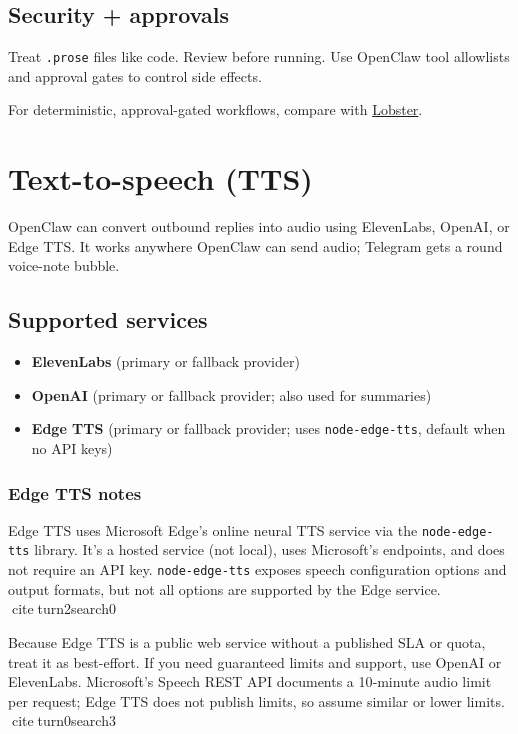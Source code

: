 \subsection{Security + approvals}


Treat \texttt{.prose} files like code. Review before running. Use OpenClaw tool allowlists and approval gates to control side effects.

For deterministic, approval-gated workflows, compare with \href{/tools/lobster}{Lobster}.


\clearpage

\section{Text-to-speech (TTS)}


OpenClaw can convert outbound replies into audio using ElevenLabs, OpenAI, or Edge TTS.
It works anywhere OpenClaw can send audio; Telegram gets a round voice-note bubble.

\subsection{Supported services}


\begin{itemize}
  \item \textbf{ElevenLabs} (primary or fallback provider)
  \item \textbf{OpenAI} (primary or fallback provider; also used for summaries)
  \item \textbf{Edge TTS} (primary or fallback provider; uses \texttt{node-edge-tts}, default when no API keys)
\end{itemize}


\subsubsection{Edge TTS notes}


Edge TTS uses Microsoft Edge's online neural TTS service via the \texttt{node-edge-tts}
library. It's a hosted service (not local), uses Microsoft’s endpoints, and does
not require an API key. \texttt{node-edge-tts} exposes speech configuration options and
output formats, but not all options are supported by the Edge service. citeturn2search0

Because Edge TTS is a public web service without a published SLA or quota, treat it
as best-effort. If you need guaranteed limits and support, use OpenAI or ElevenLabs.
Microsoft's Speech REST API documents a 10‑minute audio limit per request; Edge TTS
does not publish limits, so assume similar or lower limits. citeturn0search3

